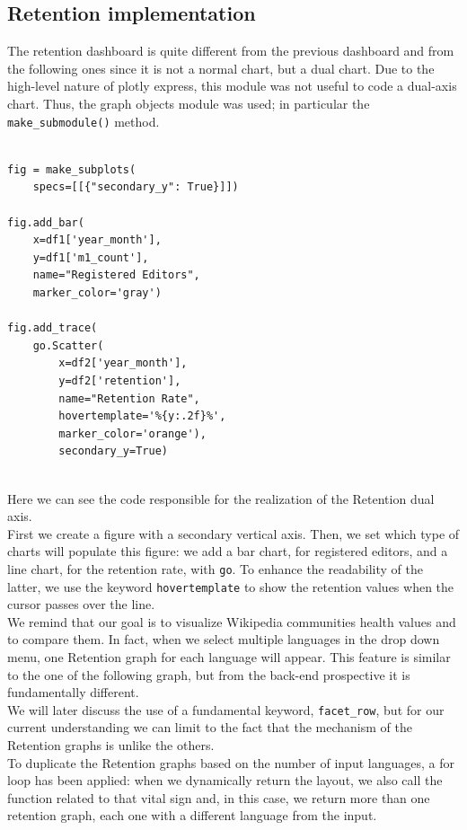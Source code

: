 \subsection{Retention implementation}
\label{sec:retention_callback}

The retention dashboard is quite different from the previous dashboard and from the following ones since it is not a normal chart, but a dual chart.  Due to the high-level nature of plotly express, this module was not useful to code a dual-axis chart. Thus, the graph objects module was used; in particular the \verb#make_submodule()# method.

\lstset{frame=lines}
\lstset{basicstyle=\footnotesize}
\lstset{caption=Creating a dual axis: line chart and bar chart}
\begin{lstlisting}

fig = make_subplots(
    specs=[[{"secondary_y": True}]])

fig.add_bar(
    x=df1['year_month'],
    y=df1['m1_count'],
    name="Registered Editors",
    marker_color='gray')

fig.add_trace(
    go.Scatter(
        x=df2['year_month'],
        y=df2['retention'],
        name="Retention Rate",
        hovertemplate='%{y:.2f}%',
        marker_color='orange'),
        secondary_y=True)
    
\end{lstlisting}

Here we can see the code responsible for the realization of the Retention dual axis. \\
First we create a figure with a secondary vertical axis. Then, we set which type of charts will populate this figure: we add a bar chart, for registered editors, and a line chart, for the retention rate, with \verb#go#. To enhance the readability of the latter, we use the keyword \verb#hovertemplate# to show the retention values when the cursor passes over the line.\\
We remind that our goal is to visualize Wikipedia communities health values and to compare them. In fact, when we select multiple languages in the drop down menu, one Retention graph for each language will appear. This feature is similar to the one of the following graph, but from the back-end prospective it is fundamentally different.\\
We will later discuss the use of a fundamental keyword, \verb#facet_row#, but for our current understanding we can limit to the fact that the mechanism of the Retention graphs is unlike the others.\\
To duplicate the Retention graphs based on the number of input languages, a for loop has been applied: when we dynamically return the layout, we also call the function related to that vital sign and, in this case, we return more than one retention graph, each one with a different language from the input.

